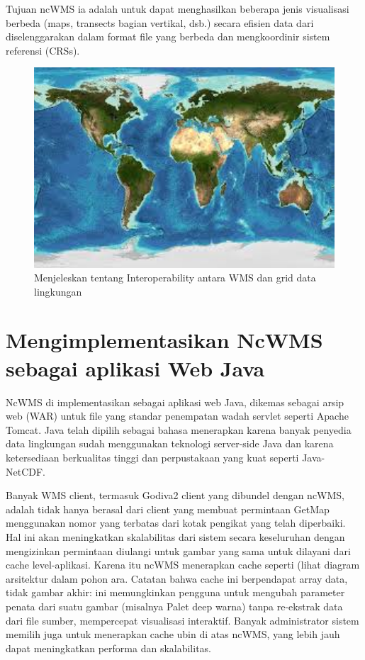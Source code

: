 Tujuan ncWMS ia adalah untuk dapat menghasilkan beberapa jenis visualisasi berbeda (maps, transects bagian vertikal, dsb.) secara
efisien data dari diselenggarakan dalam format file yang berbeda dan mengkoordinir sistem referensi (CRSs).
\begin{figure}[ht]
\centerline{\includegraphics[width=1\textwidth]{figures/wmsimage.jpg}}
\caption{Menjeleskan tentang Interoperability antara WMS dan grid data lingkungan}	
\label{Web Map Service}
\end{figure}

\section{Mengimplementasikan NcWMS sebagai aplikasi Web Java}
NcWMS di implementasikan sebagai aplikasi web Java, dikemas sebagai arsip web (WAR) untuk file yang standar penempatan wadah servlet
seperti Apache Tomcat. Java telah dipilih sebagai bahasa menerapkan karena banyak penyedia data lingkungan sudah menggunakan teknologi
server-side Java dan karena ketersediaan berkualitas tinggi dan perpustakaan yang kuat seperti Java-NetCDF.

Banyak WMS client, termasuk Godiva2 client yang dibundel dengan ncWMS, adalah tidak hanya berasal dari client yang membuat permintaan
GetMap menggunakan nomor yang terbatas dari kotak pengikat yang telah diperbaiki. Hal ini akan meningkatkan skalabilitas dari sistem
secara keseluruhan dengan mengizinkan permintaan diulangi untuk gambar yang sama untuk dilayani dari cache level-aplikasi. Karena itu
ncWMS menerapkan cache seperti (lihat diagram arsitektur dalam pohon ara. Catatan bahwa cache ini berpendapat array data, tidak gambar
akhir: ini memungkinkan pengguna untuk mengubah parameter penata dari suatu gambar (misalnya Palet deep warna) tanpa re-ekstrak data
dari file sumber, mempercepat visualisasi interaktif. Banyak administrator sistem memilih juga untuk menerapkan cache ubin di atas
ncWMS, yang lebih jauh dapat meningkatkan performa dan skalabilitas.

